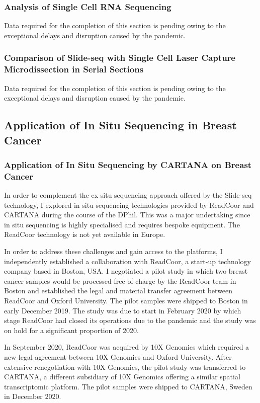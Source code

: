 \subsubsection{Analysis of Single Cell RNA Sequencing}
Data required for the completion of this section is pending owing to the exceptional delays and disruption caused by the pandemic. 

\subsubsection{Comparison of Slide-seq with Single Cell Laser Capture Microdissection in Serial Sections}
Data required for the completion of this section is pending owing to the exceptional delays and disruption caused by the pandemic. 

\subsection{Application of In Situ Sequencing in Breast Cancer}
\subsubsection{Application of In Situ Sequencing by CARTANA on Breast Cancer}
In order to complement the ex situ sequencing approach offered by the Slide-seq technology, I explored in situ sequencing technologies provided by ReadCoor and CARTANA during the course of the DPhil. This was a major undertaking since in situ sequencing is highly specialised and requires bespoke equipment. The ReadCoor technology is not yet available in Europe.

In order to address these challenges and gain access to the platforms, I independently established a collaboration with ReadCoor, a start-up technology company based in Boston, USA. I negotiated a pilot study in which two breast cancer samples would be processed free-of-charge by the ReadCoor team in Boston and established the legal and material transfer agreement between ReadCoor and Oxford University. The pilot samples were shipped to Boston in early December 2019. The study was due to start in February 2020 by which stage ReadCoor had closed its operations due to the pandemic and the study was on hold for a significant proportion of 2020. 

In September 2020, ReadCoor was acquired by 10X Genomics which required a new legal agreement between 10X Genomics and Oxford University. After extensive renegotiation with 10X Genomics, the pilot study was transferred to CARTANA, a different subsidiary of 10X Genomics offering a similar spatial transcriptomic platform. The pilot samples were shipped to CARTANA, Sweden in December 2020. 

